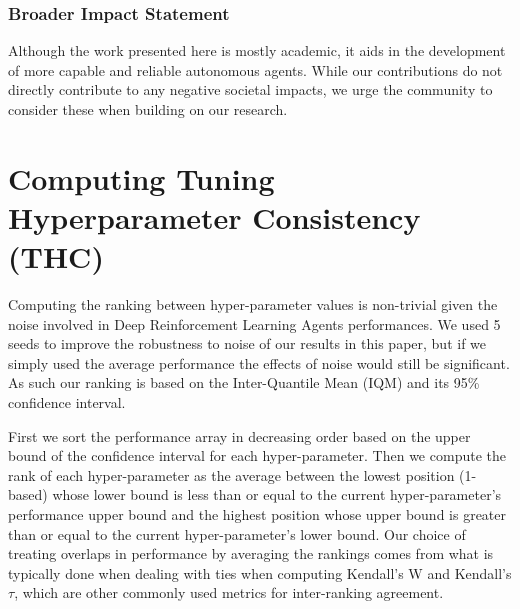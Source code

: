 \documentclass[10pt]{article} %
\begin{document}
\subsubsection*{Broader Impact Statement}

Although the work presented here is mostly academic, it aids in the development of more capable and reliable autonomous agents. While our contributions do not directly contribute to any negative societal impacts, we urge the community to consider these when building on our research.




\newpage
\appendix
\section{Computing Tuning Hyperparameter Consistency (THC)}
\label{sec:appendixTHC}
Computing the ranking between hyper-parameter values is non-trivial given the noise involved in Deep Reinforcement Learning Agents performances. We used 5 seeds to improve the robustness to noise of our results in this paper, but if we simply used the average performance the effects of noise would still be significant. As such our ranking is based on the Inter-Quantile Mean (IQM) \citep{agarwal2021deep} and its 95\% confidence interval.

First we sort the performance array in decreasing order based on the upper bound of the confidence interval for each hyper-parameter. Then we compute the rank of each hyper-parameter as the average between the lowest position (1-based) whose lower bound is less than or equal to the current hyper-parameter's performance upper bound and the highest position whose upper bound is greater than or equal to the current hyper-parameter's lower bound. Our choice of treating overlaps in performance by averaging the rankings comes from what is typically done when dealing with ties when computing Kendall's W and Kendall's $\tau$, which are other commonly used metrics for inter-ranking agreement.
\end{document}
